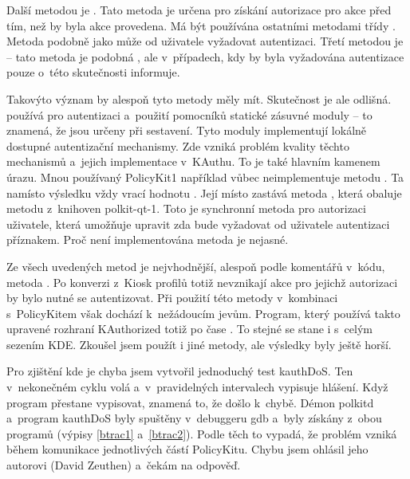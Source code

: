Další metodou je . Tato metoda je určena pro získání autorizace pro akce před tím, než by byla akce provedena. Má být používána ostatními metodami třídy .  Metoda podobně jako  může od uživatele vyžadovat autentizaci. Třetí metodou je  -- tato metoda je podobná , ale v~případech, kdy by byla vyžadována autentizace pouze o~této skutečnosti
informuje.

Takovýto význam by alespoň tyto metody měly mít. Skutečnost je ale odlišná.  používá pro autentizaci a~použití pomocníků statické zásuvné moduly -- to znamená, že jsou určeny při sestavení. Tyto moduly implementují lokálně dostupné autentizační mechanismy. Zde vzniká problém kvality těchto mechanismů a~jejich implementace v~KAuthu. To je také hlavním kamenem úrazu. Mnou používaný PolicyKit1 například vůbec neimplementuje metodu . Ta namísto výsledku vždy vrací hodnotu . Její místo zastává metoda , která obaluje metodu  z~knihoven polkit-qt-1. Toto je synchronní metoda pro autorizaci uživatele, která umožňuje upravit zda bude vyžadovat od uživatele autentizaci příznakem. Proč není implementována metoda  je nejasné.

Ze všech uvedených metod je nejvhodnější, alespoň podle komentářů v~kódu, metoda . Po konverzi z~Kiosk profilů totiž nevznikají akce pro jejichž autorizaci by bylo nutné se autentizovat. Při použití této metody v~kombinaci s~PolicyKitem však dochází k~nežádoucím jevům. Program, který používá takto upravené rozhraní KAuthorized totiž po čase . To stejné se stane i s~celým sezením KDE. Zkoušel jsem použít i jiné metody, ale výsledky byly ještě horší.

Pro zjištění kde je chyba jsem vytvořil jednoduchý test kauthDoS. Ten v~nekonečném cyklu volá  a~v~pravidelných intervalech vypisuje hlášení. Když program přestane vypisovat, znamená to, že došlo k~chybě. Démon polkitd a~program kauthDoS byly spuštěny v~debuggeru gdb a~byly získány  z~obou programů (výpisy \ref{btrac1} a~\ref{btrac2}). Podle těch to vypadá, že problém vzniká během komunikace jednotlivých částí PolicyKitu. Chybu jsem ohlásil jeho autorovi (David Zeuthen) a~čekám na odpověď.

